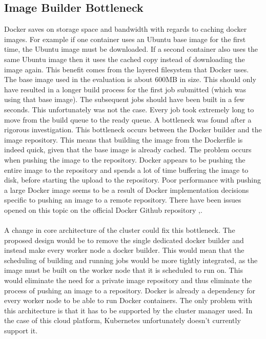 \documentclass{sig-alternate-05-2015}
\begin{document}
\subsection{Image Builder Bottleneck}
Docker saves on storage space and bandwidth with regards to caching docker images. For example if one container uses an Ubuntu base image for the first time, the Ubuntu image must be downloaded. If a second container also uses the same Ubuntu image then it uses the cached copy instead of downloading the image again. This benefit comes from the layered filesystem that Docker uses. 
The base image used in the evaluation is about 600MB in size. This should only have resulted in a longer build process for the first job submitted (which was using that base image). The subsequent jobs should have been built in a few seconds. This unfortunately was not the case. Every job took extremely long to move from the build queue to the ready queue. A bottleneck was found after a rigorous investigation. This bottleneck occurs between the Docker builder and the image repository. This means that building the image from the Dockerfile is indeed quick, given that the base image is already cached. The problem occurs when pushing the image to the repository. Docker appears to be pushing the entire image to the repository and spends a lot of time buffering the image to disk, before starting the upload to the repository. Poor performance with pushing a large Docker image seems to be a result of Docker implementation decisions specific to pushing an image to a remote repository. There have been issues opened on this topic on the official Docker Github repository \cite{dockerpushperformance},\cite{dockercrossrepopush}.
\\\\
A change in core architecture of the cluster could fix this bottleneck. The proposed design would be to remove the single dedicated docker builder and instead make every worker node a docker builder. This would mean that the scheduling of building and running jobs would be more tightly integrated, as the image must be built on the worker node that it is scheduled to run on. This would eliminate the need for a private image repository and thus eliminate the process of pushing an image to a repository. Docker is already a dependency for every worker node to be able to run Docker containers. The only problem with this architecture is that it has to be supported by the cluster manager used. In the case of this cloud platform, Kubernetes unfortunately doesn't currently support it. 
\end{document}
